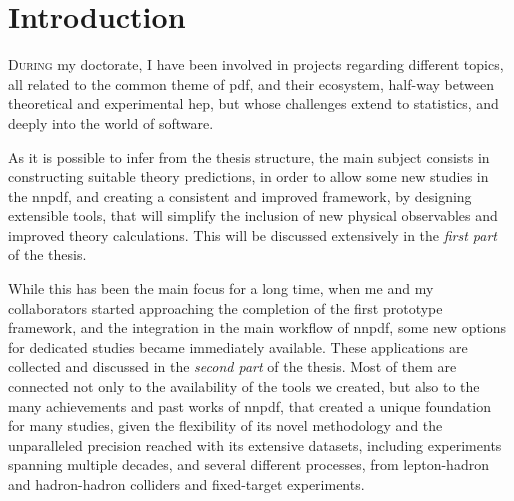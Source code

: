 
\cleardoublepage
{}

\chapter*{Introduction}
%
	{}


\lettrine[lines=3]{\color{BrickRed}D}{uring} my doctorate, I have been involved
in projects regarding different topics, all related to the common theme of
\acrfull{pdf}, and their ecosystem, half-way between theoretical and
experimental \acrfull{hep}, but whose challenges extend to statistics, and
deeply into the world of software.

As it is possible to infer from the thesis structure, the main subject
consists in constructing suitable theory predictions, in order to allow some
new studies in the \acrlong{nnpdf}, and creating a consistent and improved
framework, by designing extensible tools, that will simplify the inclusion of
new physical observables and improved theory calculations.
This will be discussed extensively in the \textit{first part} of the thesis.

While this has been the main focus for a long time, when me and my
collaborators started approaching the completion of the first prototype
framework, and the integration in the main workflow of \acrshort{nnpdf}, some
new options for dedicated studies became immediately available.
These applications are collected and discussed in the \textit{second part} of
the thesis.
Most of them are connected not only to the availability of the tools we
created, but also to the many achievements and past works of \acrshort{nnpdf},
that created a unique foundation for many studies, given the flexibility of its
novel methodology and the unparalleled precision reached with its extensive
datasets, including experiments spanning multiple decades, and several
different processes, from lepton-hadron and hadron-hadron colliders and
fixed-target experiments.
